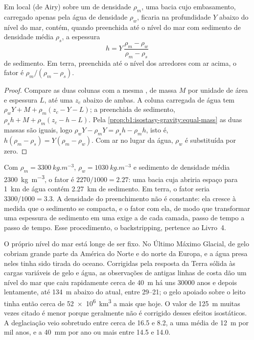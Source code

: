 \begin{proposition}\label{prop:b1:diagenesis-basins:loading}
Em  local (de Airy) sobre um  de densidade $\rho_m$, uma bacia cujo embasamento,
carregado apenas pela água de densidade $\rho_w$, ficaria na profundidade $Y$ abaixo do nível
do mar, contém, quando preenchida até o nível do mar com sedimento de densidade média
$\rho_s$, a espessura
\[
  h = Y\,\frac{\rho_m - \rho_w}{\rho_m - \rho_s}
\]
de sedimento. Em terra, preenchida até o nível dos arredores com ar acima, o fator é
$\rho_m/(\rho_m - \rho_s)$.
\end{proposition}

\begin{proof}
Compare as duas colunas com a mesma , de massa $M$ por unidade de área e espessura
$L$, até uma  $z_c$ abaixo de ambas. A coluna carregada de água
tem $\rho_w Y + M + \rho_m(z_c - Y - L)$; a preenchida de sedimento,
$\rho_s h + M + \rho_m(z_c - h - L)$. Pela \cref{prop:b1:isostasy-gravity:equal-mass} as duas
massas são iguais, logo $\rho_w Y - \rho_m Y = \rho_s h - \rho_m h$, isto é, $h(\rho_m - \rho_s) =
Y(\rho_m - \rho_w)$. Com ar no lugar da água, $\rho_w$ é substituída por zero.
\end{proof}

Com $\rho_m = \qty{3300}{kg.m^{-3}}$, $\rho_w = \qty{1030}{kg.m^{-3}}$ e sedimento de densidade
média \qty{2300}{kg.m^{-3}}, o fator é $2270/1000 = \num{2.27}$: uma bacia cuja  abriria espaço para \qty{1}{km} de água contém \qty{2.27}{km} de sedimento. Em terra,
o fator seria $3300/1000 = \num{3.3}$. A densidade do preenchimento não é constante: ela cresce
à medida que o sedimento se compacta, e o fator com ela, de modo que transformar uma espessura
de sedimento em uma  exige a  de cada camada, passo de tempo
a passo de tempo. Esse procedimento, o backstripping, pertence ao Livro~4.

O próprio nível do mar está longe de ser fixo. No Último Máximo Glacial,  de gelo cobriam
grande parte da América do Norte e do norte da Europa, e a água presa neles tinha sido tirada do
oceano. Corrigidas pela resposta da Terra sólida às cargas variáveis de gelo e água, as
observações de antigas linhas de costa dão um nível do mar que caiu rapidamente cerca de
\qty{40}{m} há uns \num{30000} anos e depois lentamente, até \qty{134}{m} abaixo do atual, entre
\qtyrange{29}{21}{\ka}; o gelo apoiado sobre o leito tinha então cerca de \qty{52e6}{km^3} a mais
que hoje. O valor de \qty{125}{m} muitas vezes citado é menor porque geralmente não é corrigido
desses efeitos isostáticos. A deglaciação veio sobretudo entre cerca de \qty{16.5}{\ka} e
\qty{8.2}{\ka}, a uma média de \qty{12}{m} por mil anos, e a \qty{40}{mm} por ano ou mais entre
\qty{14.5}{\ka} e \qty{14.0}{\ka}.

